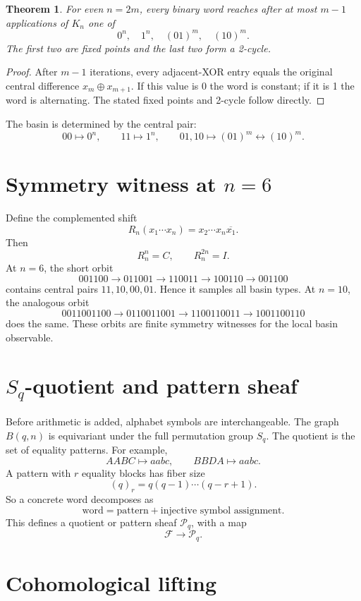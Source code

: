 \documentclass[11pt]{article}
\newtheorem{theorem}{Theorem}
\begin{document}
\begin{theorem}
For even \(n=2m\), every binary word reaches after at most \(m-1\) applications of \(K_n\) one of
\[
0^n,\quad 1^n,\quad (01)^m,\quad (10)^m.
\]
The first two are fixed points and the last two form a 2-cycle.
\end{theorem}

\begin{proof}
After \(m-1\) iterations, every adjacent-XOR entry equals the original central difference \(x_m\oplus x_{m+1}\). If this value is 0 the word is constant; if it is 1 the word is alternating. The stated fixed points and 2-cycle follow directly.
\end{proof}

The basin is determined by the central pair:
\[
00\mapsto 0^n,\qquad 11\mapsto 1^n,\qquad 01,10\mapsto (01)^m\leftrightarrow(10)^m.
\]

\section{Symmetry witness at \(n=6\)}

Define the complemented shift
\[
R_n(x_1\cdots x_n)=x_2\cdots x_n\overline{x_1}.
\]
Then
\[
R_n^n=C,\qquad R_n^{2n}=I.
\]
At \(n=6\), the short orbit
\[
001100\to011001\to110011\to100110\to001100
\]
contains central pairs \(11,10,00,01\). Hence it samples all basin types. At \(n=10\), the analogous orbit
\[
0011001100\to0110011001\to1100110011\to1001100110
\]
does the same. These orbits are finite symmetry witnesses for the local basin observable.

\section{\(S_q\)-quotient and pattern sheaf}

Before arithmetic is added, alphabet symbols are interchangeable. The graph \(B(q,n)\) is equivariant under the full permutation group \(S_q\). The quotient is the set of equality patterns. For example,
\[
AABC\mapsto aabc,\qquad BBDA\mapsto aabc.
\]
A pattern with \(r\) equality blocks has fiber size
\[
(q)_r=q(q-1)\cdots(q-r+1).
\]
So a concrete word decomposes as
\[
\text{word}=\text{pattern}+\text{injective symbol assignment}.
\]
This defines a quotient or pattern sheaf \(\mathcal P_q\), with a map
\[
\mathcal F\to\mathcal P_q.
\]

\section{Cohomological lifting}
\end{document}
